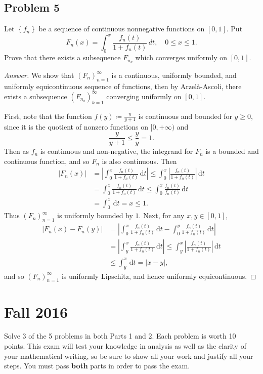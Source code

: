 \documentclass[12pt]{article}
\newcommand\paren[1]{\left( #1 \right)}
\newcommand\setb[1]{\left \{ #1 \right \}}
\newcommand{\abs}[1]{\left | #1 \right |}
\renewcommand{\i}[4]{\int_{#1}^{#2} {#3} \, \mathrm{d} {#4} }
\theoremstyle{definition}
\begin{document}
\subsection{Problem 5}
Let $\setb{ f_n }$ be a sequence of continuous nonnegative functions on $[0,1]$. Put 
\[
    F_n(x) = \int_0^x \frac{f_n(t)}{1 + f_n(t)} \, dt , \quad 0 \leq x \leq 1 . 
\]
Prove that there exists a subsequence $F_{n_k}$ which converges uniformly on $[0,1]$. 
\begin{proof}[Answer]
    We show that $\paren{ F_n }_{n = 1}^{\infty}$ is a continuous, uniformly bounded, and uniformly equicontinuous sequence of functions, then by Arzel\`a-Ascoli, there exists a subsequence $\paren{ F_{n_k} }_{k = 1}^{\infty}$ converging uniformly on $[0,1]$. 
    
    First, note that the function $f(y) \coloneqq \frac{y}{y + 1}$ is continuous and bounded for $y \geq 0$, since it is the quotient of nonzero functions on $[0,+\infty)$ and 
    \[
        \frac{y}{y + 1} \leq \frac{y}{y} = 1 . 
    \]
    Then as $f_n$ is continuous and non-negative, the integrand for $F_n$ is a bounded and continuous function, and so $F_n$ is also continuous. Then 
    \begin{align*}
        \abs{ F_n(x) } & = \abs{ \i{0}{x}{ \frac{f_n(t)}{1 + f_n(t)} }{t} } \leq \i{0}{x}{ \abs{ \frac{f_n(t)}{1 + f_n(t)} } }{t} \\ 
        & = \i{0}{x}{ \frac{f_n(t)}{1 + f_n(t)} }{t} \leq \i{0}{x}{ \frac{f_n(t)}{f_n(t)} }{t} \\ 
        & = \i{0}{x}{}{t} = x \leq 1 .
    \end{align*}
    Thus $\paren{ F_n }_{n = 1}^{\infty}$ is uniformly bounded by $1$. Next, for any $x , y \in [0,1]$, 
    \begin{align*}
        \abs{ F_n(x) - F_n(y) } & = \abs{ \i{0}{x}{ \frac{f_n(t)}{1 + f_n(t)} }{t} - \i{0}{y}{ \frac{f_n(t)}{1 + f_n(t)} }{t} } \\ 
        & = \abs{ \i{y}{x}{ \frac{f_n(t)}{1 + f_n(t)} }{t} } \leq \i{y}{x}{ \abs{ \frac{f_n(t)}{1 + f_n(t)} } }{t} \\ 
        & \leq \i{y}{x}{}{t} = \abs{x - y} , 
    \end{align*}
    and so $\paren{ F_n }_{n = 1}^{\infty}$ is uniformly Lipschitz, and hence uniformly equicontinuous. 
\end{proof}

\newpage 
\section{Fall 2016}
Solve 3 of the 5 problems in both Parts 1 and 2. Each problem is worth 10 points. This exam will test your knowledge in analysis as well as the clarity of your mathematical writing, so be sure to show all your work and justify all your steps. You must pass \textbf{both} parts in order to pass the exam. 
\end{document}
